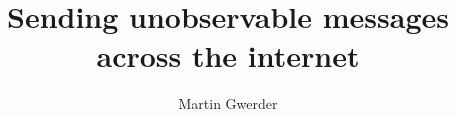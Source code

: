 \documentclass[9pt,journal,compsoc]{IEEEtran}
\begin{document}
%
\title{Sending unobservable messages across the internet}
%
%
%
%

\ifCLASSOPTIONpeerreview
\author{}
\else
\author{Martin Gwerder%
}
\fi

% 
%
\end{document}
